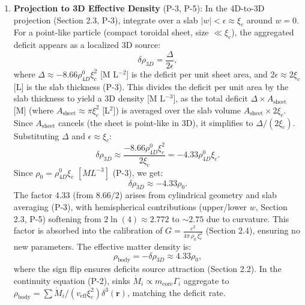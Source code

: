 \begin{enumerate}
\item \textbf{Projection to 3D Effective Density} (P-3, P-5): In the 4D-to-3D projection (Section 2.3, P-3), integrate over a slab $|w| < \epsilon \approx \xi_c$ around $w=0$. For a point-like particle (compact toroidal sheet, size $\ll \xi_c$), the aggregated deficit appears as a localized 3D source:
   \[
   \delta \rho_{3D} = \frac{\Delta}{2\epsilon},
   \]
   where $\Delta \approx -8.66 \rho_{4D}^0 \xi_c^2$ [M L$^{-2}$] is the deficit per unit sheet area, and $2\epsilon \approx 2\xi_c$ [L] is the slab thickness (P-3). This divides the deficit per unit area by the slab thickness to yield a 3D density [M L$^{-3}$], as the total deficit $\Delta \times A_{\text{sheet}}$ [M] (where $A_{\text{sheet}} \approx \pi \xi_c^2$ [L$^2$]) is averaged over the slab volume $A_{\text{sheet}} \times 2\xi_c$. Since $A_{\text{sheet}}$ cancels (the sheet is point-like in 3D), it simplifies to $\Delta / (2\xi_c)$. Substituting $\Delta$ and $\epsilon \approx \xi_c$:
   \[
   \delta \rho_{3D} \approx \frac{-8.66 \rho_{4D}^0 \xi_c^2}{2\xi_c} = -4.33 \rho_{4D}^0 \xi_c.
   \]
   Since $\rho_0 = \rho_{4D}^0 \xi_c$ $[M L^{-3}]$ (P-3), we get:
   \[
   \delta \rho_{3D} \approx -4.33 \rho_0.
   \]
   The factor $4.33$ (from $8.66 / 2$) arises from cylindrical geometry and slab averaging (P-3), with hemispherical contributions (upper/lower $w$, Section 2.3, P-5) softening from $2 \ln(4) \approx 2.772$ to $\sim 2.75$ due to curvature. This factor is absorbed into the calibration of $G = \frac{c^2}{4\pi \, \rho_0 \, \xi_c^2}$ (Section 2.4), ensuring no new parameters. The effective matter density is:
   \[
   \rho_{\text{body}} = - \delta \rho_{3D} \approx 4.33 \rho_0,
   \]
   where the sign flip ensures deficits source attraction (Section 2.2). In the continuity equation (P-2), sinks $\dot{M}_i \propto m_{\text{core}} \Gamma_i$ aggregate to $\rho_{\text{body}} = \sum \dot{M}_i / (v_{\text{eff}} \xi_c^2) \delta^3(\mathbf{r})$, matching the deficit rate.


\end{enumerate}

